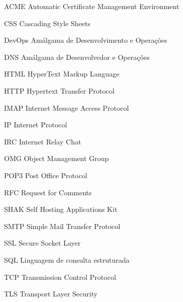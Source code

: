 \begin{siglas}
  \item[ACME] Automatic Certificate Management Environment
  \item[CSS] Cascading Style Sheets
  \item[DevOps] Amálgama de Desenvolvimento e Operações
  \item[DNS] Amálgama de Desenvolvedor e Operações
  \item[HTML] HyperText Markup Language
  \item[HTTP] Hypertext Transfer Protocol
  \item[IMAP] Internet Message Access Protocol
  \item[IP] Internet Protocol
  \item[IRC] Internet Relay Chat
  \item[OMG] Object Management Group
  \item[POP3] Post Office Protocol 
  \item[RFC] Request for Comments
  \item[SHAK] Self Hosting Applications Kit
  \item[SMTP] Simple Mail Transfer Protocol
  \item[SSL] Secure Socket Layer
  \item[SQL] Linguagem de consulta estruturada
  \item[TCP] Transmission Control Protocol 
  \item[TLS] Transport Layer Security
\end{siglas}
